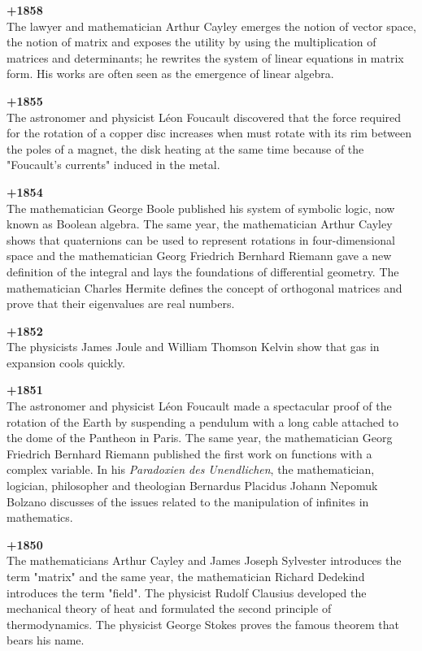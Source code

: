 \textbf{+1858}\\
The lawyer and mathematician Arthur Cayley emerges the notion of vector space, the notion of matrix and exposes the utility by using the multiplication of matrices and determinants; he rewrites the system of linear equations in matrix form. His works are often seen as the emergence of linear algebra.

\textbf{+1855}\\
The astronomer and physicist Léon Foucault discovered that the force required for the rotation of a copper disc increases when must rotate with its rim between the poles of a magnet, the disk heating at the same time because of the "Foucault's currents" induced in the metal. 

\textbf{+1854}\\
The mathematician George Boole published his system of symbolic logic, now known as Boolean algebra. The same year, the mathematician Arthur Cayley shows that quaternions can be used to represent rotations in four-dimensional space and the mathematician Georg Friedrich Bernhard Riemann gave a new definition of the integral and lays the foundations of differential geometry.  The mathematician Charles Hermite defines the concept of orthogonal matrices and prove that their eigenvalues are real numbers.

\textbf{+1852}\\
The physicists James Joule and William Thomson Kelvin show that gas in expansion cools quickly.

\textbf{+1851}\\
The astronomer and physicist Léon Foucault made a spectacular proof of the rotation of the Earth by suspending a pendulum with a long cable attached to the dome of the Pantheon in Paris. The same year, the mathematician Georg Friedrich Bernhard Riemann published the first work on functions with a complex variable. In his \textit{Paradoxien des Unendlichen}, the  mathematician, logician, philosopher and theologian Bernardus Placidus Johann Nepomuk Bolzano discusses of the issues related to the manipulation of infinites in mathematics. 

\textbf{+1850}\\
The mathematicians Arthur Cayley and James Joseph Sylvester introduces the term "matrix" and the same year, the mathematician Richard Dedekind introduces the term "field". The physicist Rudolf Clausius developed the mechanical theory of heat and formulated the second principle of thermodynamics. The physicist George Stokes proves the famous theorem that bears his name.


